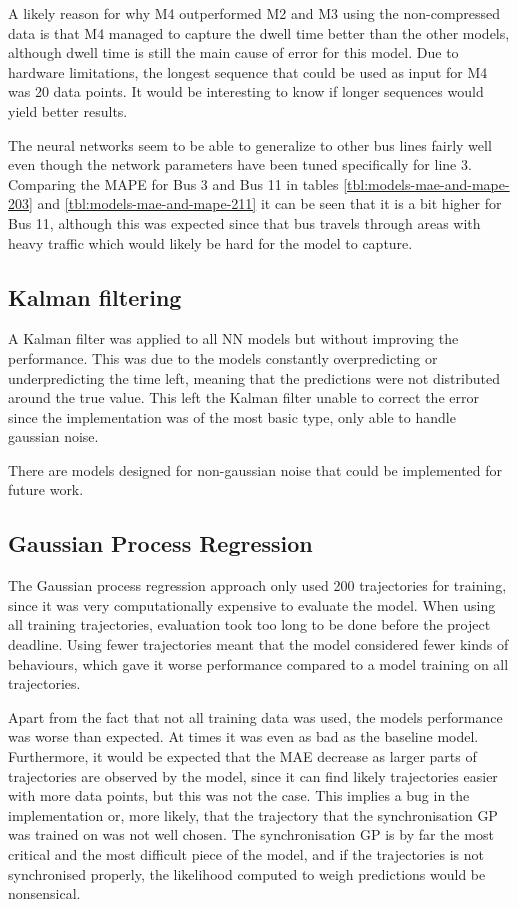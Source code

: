A likely reason for why M4 outperformed M2 and M3 using the non-compressed data is that M4 managed to capture the dwell time better than the other models, although dwell time is still the main cause of error for this model. Due to hardware limitations, the longest sequence that could be used as input for M4 was 20 data points. It would be interesting to know if longer sequences would yield better results.

The neural networks seem to be able to generalize to other bus lines fairly well even though the network parameters have been tuned specifically for line 3. Comparing the MAPE for Bus 3 and Bus 11 in tables \ref{tbl:models-mae-and-mape-203} and \ref{tbl:models-mae-and-mape-211} it can be seen that it is a bit higher for Bus 11, although this was expected since that bus travels through areas with heavy traffic which would likely be hard for the model to capture.

\subsection{Kalman filtering}
A Kalman filter was applied to all NN models but without improving the performance. This was due to the models constantly overpredicting or underpredicting the time left, meaning that the predictions were not distributed around the true value. This left the Kalman filter unable to correct the error since the implementation was of the most basic type, only able to handle gaussian noise. 

There are models designed for non-gaussian noise that could be implemented for future work.

\subsection{Gaussian Process Regression}
The Gaussian process regression approach only used 200 trajectories
for training, since it was very computationally expensive to evaluate
the model. When using all training trajectories, evaluation took too
long to be done before the project deadline. Using fewer trajectories
meant that the model considered fewer kinds of behaviours, which gave
it worse performance compared to a model training on all trajectories.

Apart from the fact that not all training data was used, the models performance was worse than expected. At times it was even as bad as the baseline model. Furthermore, it would be expected that the MAE decrease as larger parts of trajectories are observed by the model, since it can find likely trajectories easier with more data points, but this was not the case. This implies a bug in the implementation or, more likely, that the trajectory that the synchronisation GP was trained on was not well chosen. The synchronisation GP is by far the most critical and the most difficult piece of the model, and if the trajectories is not synchronised properly, the likelihood computed to weigh predictions would be nonsensical. 

